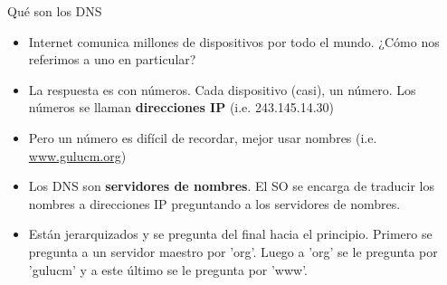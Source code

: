 \documentclass[spanish]{beamer}
\begin{document}
\begin{frame}{Qué son los DNS}
\begin{itemize}
\item Internet comunica millones de dispositivos por todo el mundo. ¿Cómo nos referimos a uno en particular?
\item La respuesta es con números. Cada dispositivo (casi), un número. Los números se llaman {\bf direcciones IP} (i.e. 243.145.14.30)
\item Pero un número es difícil de recordar, mejor usar nombres (i.e. \url{www.gulucm.org})
\item Los DNS son {\bf servidores de nombres}. El SO se encarga de traducir los nombres a direcciones IP preguntando a los servidores de nombres.
\item Están jerarquizados y se pregunta del final hacia el principio. Primero se pregunta a un servidor maestro por 'org'. Luego a 'org' se le pregunta por 'gulucm' y a este último se le pregunta por 'www'.
\end{itemize}
\end{frame}
\end{document}
